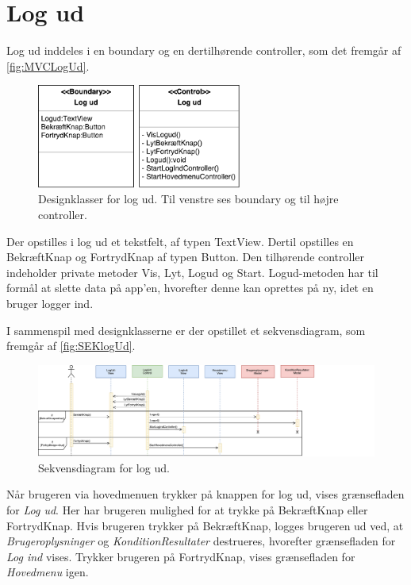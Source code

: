 \section*{Log ud}
Log ud inddeles i en boundary og en dertilhørende controller, som det fremgår af \autoref{fig:MVCLogUd}. 

\begin{figure} [H]
\centering
\includegraphics[width=0.6\textwidth]{figures/MVC/Logud}
\caption{Designklasser for log ud. Til venstre ses boundary og til højre controller.}
\label{fig:MVCLogUd}
\end{figure}

\noindent
Der opstilles i log ud et tekstfelt, af typen TextView. Dertil opstilles en BekræftKnap og FortrydKnap af typen Button. 
Den tilhørende controller indeholder private metoder Vis, Lyt, Logud og Start. Logud-metoden har til formål at slette data på app'en, hvorefter denne kan oprettes på ny, idet en bruger logger ind. 

I sammenspil med designklasserne er der opstillet et sekvensdiagram, som fremgår af \autoref{fig:SEKlogUd}.

\begin{figure} [H]
\centering
\includegraphics[width=1.28\textwidth]{figures/Sek/SEKLogUd}
\caption{Sekvensdiagram for log ud.}
\label{fig:SEKlogUd}
\end{figure}

\noindent
Når brugeren via hovedmenuen trykker på knappen for log ud, vises grænsefladen for \textit{Log ud}. Her har brugeren mulighed for at trykke på BekræftKnap eller FortrydKnap. Hvis brugeren trykker på BekræftKnap, logges brugeren ud ved, at \textit{Brugeroplysninger} og \textit{KonditionResultater} destrueres, hvorefter grænsefladen for \textit{Log ind} vises. Trykker brugeren på FortrydKnap, vises grænsefladen for \textit{Hovedmenu} igen. 
